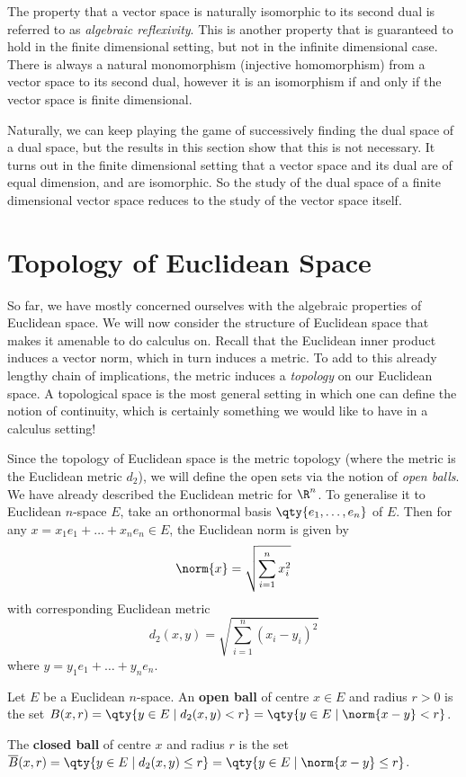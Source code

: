 The property that a vector space is naturally isomorphic to its second dual is referred to as \emph{algebraic reflexivity}. This is another property that is guaranteed to hold in the finite dimensional setting, but not in the infinite dimensional case. There is always a natural monomorphism (injective homomorphism) from a vector space to its second dual, however it is an isomorphism if and only if the vector space is finite dimensional.

\vspace{3mm}

Naturally, we can keep playing the game of successively finding the dual space of a dual space, but the results in this section show that this is not necessary. It turns out in the finite dimensional setting that a vector space and its dual are of equal dimension, and are isomorphic. So the study of the dual space of a finite dimensional vector space reduces to the study of the vector space itself.

\section{Topology of Euclidean Space}
So far, we have mostly concerned ourselves with the algebraic properties of Euclidean space. We will now consider the structure of Euclidean space that makes it amenable to do calculus on. Recall that the Euclidean inner product induces a vector norm, which in turn induces a metric. To add to this already lengthy chain of implications, the metric induces a \emph{topology} on our Euclidean space. A topological space is the most general setting in which one can define the notion of continuity, which is certainly something we would like to have in a calculus setting!

\vspace{3mm}

Since the topology of Euclidean space is the metric topology (where the metric is the Euclidean metric \( d_2 \)), we will define the open sets via the notion of \emph{open balls}. We have already described the Euclidean metric for \( \R^n \). To generalise it to Euclidean \( n \)-space \( E \), take an orthonormal basis \( \qty{e_1,\dots,e_n} \) of \( E \). Then for any \( x=x_1e_1+\dots+x_ne_n\in E \), the Euclidean norm is given by
\[ \norm{x}=\sqrt{\sum_{i=1}^nx_i^2} \]
with corresponding Euclidean metric
\[ d_2(x,y)=\sqrt{\sum_{i=1}^n(x_i-y_i)^2} \]
where \( y=y_1e_1+\dots+y_ne_n \).

\begin{definition}
  Let \( E \) be a Euclidean \( n \)-space. An \textbf{open ball} of centre \( x\in E \) and radius \( r>0 \) is the set \( B(x,r)=\qty{y\in E\mid d_2(x,y)<r}=\qty{y\in E\mid \norm{x-y}<r} \).

  \vspace{3mm}

  The \textbf{closed ball} of centre \( x \) and radius \( r \) is the set \( \overline{B}(x,r)=\qty{y\in E\mid d_2(x,y)\leq r}=\qty{y\in E\mid \norm{x-y}\leq r} \).
\end{definition}

